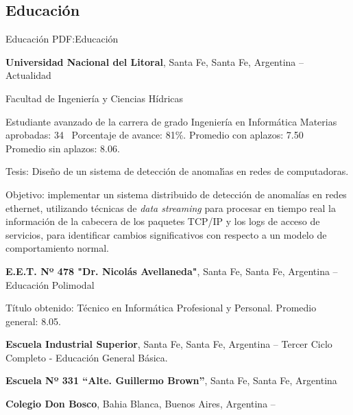 \documentclass[letterpaper,MMMyyyy,nonstop]{simpleresumecv}
\begin{document}
\begin{body}


\section
{Educación}
{Educación}
{PDF:Educación}

\textbf{Universidad Nacional del Litoral},
Santa Fe, Santa Fe, Argentina
\hfill
{} --
Actualidad

\BulletItem Facultad de Ingeniería y Ciencias Hídricas
\begin{detail}
	\SubBulletItem
	Estudiante avanzado de la carrera de grado Ingeniería en Informática
	\SubBulletItem
	Materias aprobadas: 34 \SubBulletSymbol\, Porcentaje de avance: 81\%.
	\SubBulletItem Promedio con aplazos: 7.50 \SubBulletSymbol\, Promedio sin aplazos: 8.06.

\end{detail}
\BulletItem	Tesis: Diseño de un sistema de detección de anomalı́as en redes de computadoras.
\begin{detail}
	\SubBulletItem
	Objetivo: implementar un sistema distribuido de detección de anomalías en redes ethernet, utilizando técnicas de \textit{data streaming} para procesar en tiempo real la información de la cabecera de los paquetes TCP/IP y los logs de acceso de servicios, para identificar cambios significativos con respecto a un modelo de comportamiento normal.
	
\end{detail}

\BigGap
\textbf{E.E.T. Nº 478 "Dr. Nicolás Avellaneda"},
Santa Fe, Santa Fe, Argentina
\hfill
{} --
\BulletItem Educación Polimodal
\begin{detail}
	\SubBulletItem
	Título obtenido: Técnico en Informática Profesional y Personal.
	\SubBulletItem
	Promedio general: 8.05.
\end{detail}

\BigGap
\textbf{Escuela Industrial Superior},
Santa Fe, Santa Fe, Argentina
\hfill
{} --
\BulletItem
Tercer Ciclo Completo - Educación General Básica.

\BigGap
\textbf{Escuela Nº 331 “Alte. Guillermo Brown”},
Santa Fe, Santa Fe, Argentina
\hfill
{}

\BigGap
\textbf{Colegio Don Bosco},
Bahia Blanca, Buenos Aires, Argentina
\hfill
{} --


\end{body}
\end{document}
